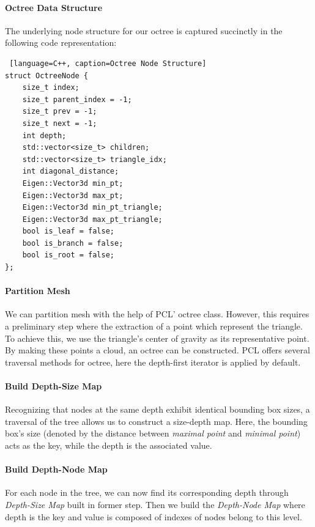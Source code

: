 \documentclass[11pt, a4paper,oneside,chapterprefix=false]{scrbook}
\begin{document}
\paragraph{Octree Data Structure}

The underlying node structure for our octree is captured succinctly in the following code representation:

\begin{lstlisting} [language=C++, caption=Octree Node Structure]
struct OctreeNode {
    size_t index;
    size_t parent_index = -1;
    size_t prev = -1;
    size_t next = -1;
    int depth;
    std::vector<size_t> children;
    std::vector<size_t> triangle_idx;
    int diagonal_distance;
    Eigen::Vector3d min_pt;
    Eigen::Vector3d max_pt;
    Eigen::Vector3d min_pt_triangle;
    Eigen::Vector3d max_pt_triangle;
    bool is_leaf = false;
    bool is_branch = false;
    bool is_root = false;
};
\end{lstlisting}

\paragraph{Partition Mesh} \label{par:mesh octree}

We can partition mesh with the help of PCL' octree class. However, this requires a preliminary step where the extraction of a point which represent the triangle. To achieve this, we use the triangle's center of gravity as its representative point. By making these points a cloud, an octree can be constructed. PCL offers several traversal methods for octree, here the depth-first iterator is applied by default.

\paragraph{Build Depth-Size Map}

Recognizing that nodes at the same depth exhibit identical bounding box sizes, a traversal of the tree allows us to construct a size-depth map. Here, the bounding box's size (denoted by the distance between \emph{maximal point} and \emph{minimal point}) acts as the key, while the depth is the associated value.

\paragraph{Build Depth-Node Map}

For each node in the tree, we can now find its corresponding depth through \emph{Depth-Size Map} built in former step. Then we build the \emph{Depth-Node Map} where depth is the key and value is composed of indexes of nodes belong to this level.
\end{document}
